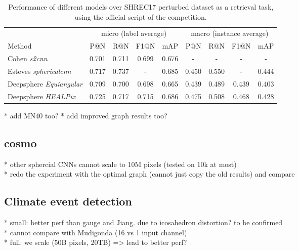 \documentclass{article} %
\begin{document}
\begin{table}[ht]
    \centering
    \begin{tabular}{l|c c c c|c c c c}
     & \multicolumn{4}{c|}{micro (label average)} & \multicolumn{4}{c}{macro (instance average)} \\
    Method & P@N & R@N & F1@N & mAP & P@N & R@N & F1@N & mAP \\ \hline
    Cohen \emph{s2cnn} & 0.701 & 0.711 & 0.699 & 0.676 & - & - & - & - \\
    Esteves \emph{sphericalcnn} & 0.717 & 0.737 & - & 0.685 & 0.450 & 0.550 & - & 0.444\\ \hline
    Deepsphere \emph{Equiangular} & 0.709 & 0.700 & 0.698 & 0.665 & 0.439 & 0.489 & 0.439 & 0.403 \\
    Deepsphere \emph{HEALPix} & 0.725 & 0.717 & 0.715 & 0.686 & 0.475 & 0.508 & 0.468 & 0.428
    \end{tabular}
    \caption{Performance of different models over SHREC17 perturbed dataset as a retrieval task, using the official script of the competition.}
    \label{tab:SHREC17_retriev}
\end{table}
* add MN40 too?
* add improved graph results too?

\subsection{cosmo}

* other sphercial CNNs cannot scale to 10M pixels (tested on 10k at most) \\
* redo the experiment with the optimal graph (cannot just copy the old results) and compare \\

\subsection{Climate event detection}

* small: better perf than gauge and Jiang. due to icosahedron distortion? to be confirmed\\
* cannot compare with Mudigonda (16 vs 1 input channel)\\
* full: we scale (50B pixels, 20TB) => lead to better perf?\\
\end{document}
